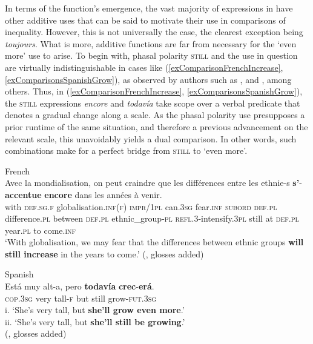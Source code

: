 {In terms of the function's emergence, the vast majority of expressions in  have other additive uses that can be said to motivate their use in comparisons of inequality. However, this is not universally the case, the clearest exception being  \textit{toujours}. What is more, additive functions are far from necessary for the \lq even more\rq{ }use to arise.  To begin with, phasal polarity \textsc{still} and the use in question are virtually indistinguishable in cases like (\ref{exComparisonFrenchIncrease}, \ref{exComparisonsSpanishGrow}),
as observed by authors such as \textcite{Bosque2016}, \textcite[165]{MosegaardHansen2008} and \textcite[76]{VictorriFuchs1996}, among others. Thus, in (\ref{exComparisonFrenchIncrease}, \ref{exComparisonsSpanishGrow}), the \textsc{still} expressions \textit{encore} and \textit{todavía} take scope over a verbal predicate that denotes a gradual change along a scale. As the phasal polarity use presupposes a prior runtime of the same situation, and therefore a previous advancement on the relevant scale, this unavoidably yields a dual comparison. In other words, such combinations make for a perfect bridge from \textsc{still} to \lq even more\rq{}.

\begin{exe}
	\ex French\label{exComparisonFrenchIncrease}\\
	\gll Avec la mondialisation, on peut craindre que les différences entre les ethnie-s \textbf{s’}-\textbf{accentue}  \textbf{encore} dans les années à venir.\\
	with \textsc{def}.\textsc{sg}.\textsc{f} globalisation.\textsc{inf}(\textsc{f}) \textsc{impr}/1\textsc{pl} can.3\textsc{sg} fear.\textsc{inf} \textsc{subord} \textsc{def}.\textsc{pl} difference.\textsc{pl} between \textsc{def}.\textsc{pl} ethnic\_group-\textsc{pl} \textsc{refl}.3-intensify.3\textsc{pl} still at \textsc{def}.\textsc{pl} year.\textsc{pl} to come.\textsc{inf}\\
	\glt \lq With globalisation, we may fear that the differences between ethnic groups \textbf{will still increase} in the years to come.\rq{ }(\cite[165]{MosegaardHansen2008}, glosses added)
 
	\ex Spanish\label{exComparisonsSpanishGrow}\\
	\gll Está muy alt-a, pero \textbf{todavía} \textbf{crec}-\textbf{erá}.\\
	\textsc{cop}.3\textsc{sg} very tall-\textsc{f} but still grow-\textsc{fut}.3\textsc{sg}\\
	\glt i.\phantom{i} \lq She's very tall, but \textbf{she'll grow even more}.\rq{}\\
	ii. \lq She's very tall, but \textbf{she'll still be growing}.\rq{}
	\\(\cite[214]{Bosque2016}, glosses added)
\end{exe}

}
